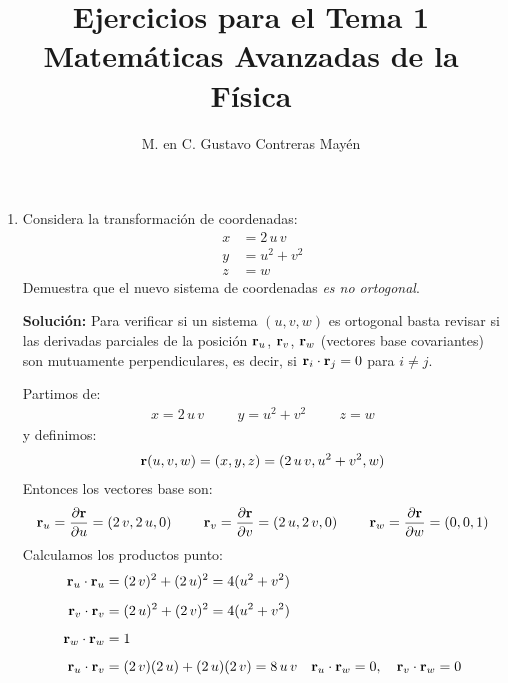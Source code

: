 \documentclass[12pt]{article}
\title{Ejercicios para el Tema 1 \\ \large{Matemáticas Avanzadas de la Física}}
\author{M. en C. Gustavo Contreras Mayén}
\date{ }
\begin{document}
\vspace{-4cm}

\maketitle
\fontsize{14}{14}\selectfont

\begin{enumerate}
\item Considera la transformación de coordenadas:
\begin{align*}
x &= 2 \, u \, v \\[0.5em]
y &= u^{2} + v^{2} \\[0.5em]
z &= w
\end{align*}
Demuestra que el nuevo sistema de coordenadas \emph{es no ortogonal}.

\vspace{1cm}
\noindent
\textbf{Solución: } Para verificar si un sistema $(u, v, w)$ es ortogonal basta revisar si las derivadas parciales de la posición $\vb{r}_{u}$, $\vb{r}_{v}$, $\vb{r}_{w}$ (vectores base covariantes) son mutuamente perpendiculares, es decir, si $\vb{r}_i \cdot \vb{r}_j = 0$ para $i \neq j$.
\par
Partimos de:
\begin{align*}
x = 2 \, u \, v \hspace{1cm} y = u^{2} + v^{2} \hspace{1cm} z = w
\end{align*}
y definimos:
\begin{align*}
\vb{r}(u, v, w) = (x, y, z) = (2 \, u \, v, u^{2} + v^{2}, w)
\end{align*}
Entonces los vectores base son:
\begin{align*}
\vb{r}_{u} = \pdv{\vb{r}}{u} = \left( 2 \, v, 2 \, u, 0 \right) \hspace{0.75cm} \vb{r}_{v} = \pdv{\vb{r}}{v} = \left( 2 \, u, 2 \, v, 0 \right) \hspace{0.75cm} \vb{r}_{w} = \pdv{\vb{r}}{w} = \left( 0, 0, 1 \right)
\end{align*}
Calculamos los productos punto:
\begin{align*}
\vb{r}_{u} \cdot \vb{r}_{u} &= (2 \, v)^2 + (2 \, u)^2 = 4(u^2 + v^2) \\[0.5em]
\vb{r}_{v} \cdot \vb{r}_{v} &= (2 \, u)^2 + (2 \, v)^2 = 4(u^2 + v^2) \\[0.5em]
\vb{r}_{w} \cdot \vb{r}_{w} &= 1 \\[0.5em]
\vb{r}_{u} \cdot \vb{r}_{v} &= (2 \, v)(2 \, u) + (2 \, u)(2 \, v) = 8 \, u \, v \quad \vb{r}_{u} \cdot \vb{r}_{w} = 0, \quad \vb{r}_{v} \cdot \vb{r}_{w} = 0

\end{align*}
\end{enumerate}
\end{document}
